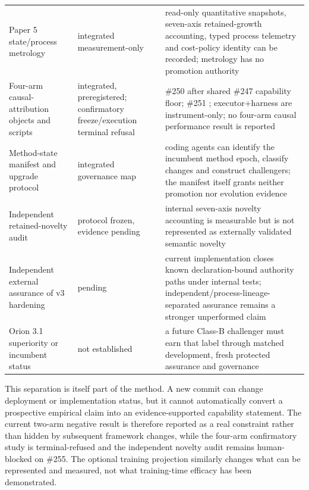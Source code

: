 \begin{tabularx}{\textwidth}{>{\raggedright\arraybackslash}p{}>{\raggedright\arraybackslash}p{}Y}
Paper 5 state/process metrology & integrated measurement-only & read-only quantitative snapshots, seven-axis retained-growth accounting, typed process telemetry and cost-policy identity can be recorded; metrology has no promotion authority \\
Four-arm causal-attribution objects and scripts & integrated, preregistered; confirmatory freeze/execution terminal refusal & \#250  after shared \#247 capability floor; \#251 ; executor+harness are instrument-only; no four-arm causal performance result is reported \\
Method-state manifest and upgrade protocol & integrated governance map & coding agents can identify the incumbent method epoch, classify changes and construct challengers; the manifest itself grants neither promotion nor evolution evidence \\
Independent retained-novelty audit & protocol frozen, evidence pending & internal seven-axis novelty accounting is measurable but is not represented as externally validated semantic novelty \\
Independent external assurance of v3 hardening & pending & current implementation closes known declaration-bound authority paths under internal tests; independent/process-lineage-separated assurance remains a stronger unperformed claim \\
Orion 3.1 superiority or incumbent status & not established & a future Class-B challenger must earn that label through matched development, fresh protected assurance and governance \\
\bottomrule
\end{tabularx}

This separation is itself part of the method. A new commit can change deployment or implementation status, but it cannot automatically convert a prospective empirical claim into an evidence-supported capability statement. The current two-arm negative result is therefore reported as a real constraint rather than hidden by subsequent framework changes, while the four-arm confirmatory study is terminal-refused and the independent novelty audit remains human-blocked on \#255. The optional training projection similarly changes what can be represented and measured, not what training-time efficacy has been demonstrated.
